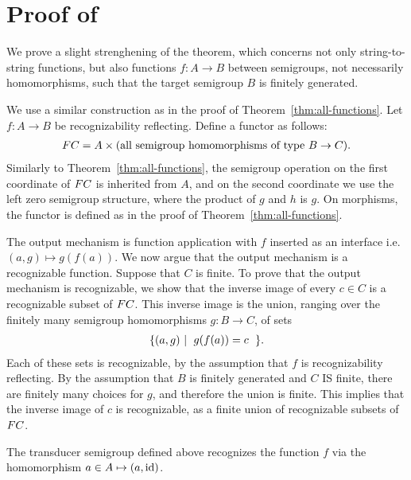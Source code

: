 \section{Proof of~}
    We prove a slight strenghening of the theorem, which concerns not only string-to-string functions, but also functions $f : A \to B$ between semigroups, not necessarily homomorphisms, such that the target semigroup $B$ is finitely generated.

      We  use a similar construction as in the proof of Theorem~\ref{thm:all-functions}. Let  $f :A \to B$  be recognizability reflecting.  Define  a functor as follows: 
    \begin{align*}
        \functor C = A \times \text{(all semigroup homomorphisms of type $B \to C$)}.
    \end{align*}
    Similarly to Theorem~\ref{thm:all-functions}, the semigroup operation on the first coordinate of $\functor C$ is inherited from $A$, and on the second coordinate we use the left zero semigroup structure,  where the product of $g$ and $h$ is $g$.     On morphisms, the functor is defined as in the proof of Theorem~\ref{thm:all-functions}. 

    The output mechanism  is function application with $f$ inserted as an interface i.e.~$(a,g) \mapsto g(f(a))$. We now argue that the output mechanism is a recognizable function. Suppose that $C$ is finite. 
     To prove that the output mechanism is recognizable, we show that the inverse image of every $c \in C$ is a  recognizable subset of $\functor C$. This inverse image is the union, ranging over the finitely many semigroup homomorphisms $g : B \to C$, of sets
    \begin{align*}
    \setbuild {(a,g)}{$g(f(a))=c$}.
    \end{align*}
    Each of these sets is recognizable, by the assumption that $f$ is recognizability reflecting.     By the assumption that $B$ is finitely generated and $C$ IS finite, there are finitely many choices for $g$, and therefore the union is finite. This implies that the inverse image of $c$ is recognizable, as a finite union of recognizable subsets of  $\functor C$.
    
    The transducer semigroup defined above recognizes the function $f$ via the homomorphism $a \in A  \mapsto  (a,\mathrm{id})$.
    
    
    
